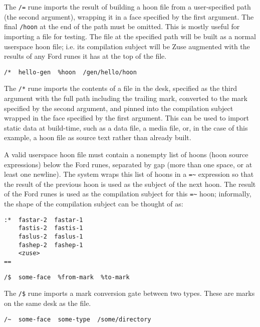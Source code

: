 \documentclass[twoside]{article}
\begin{document}
The \lstinline[style=inlinecode]{/=} rune imports the result of building a hoon file from a user-specified path (the second argument), wrapping it in a face specified by the first argument. The final \lstinline[style=inlinecode]{/hoon} at the end of the path must be omitted. This is mostly useful for importing a file for testing. The file at the specified path will be built as a normal userspace hoon file; i.e. its compilation subject will be Zuse augmented with the results of any Ford runes it has at the top of the file.

\begin{lstlisting}[style=listingcode]
/*  hello-gen  %hoon  /gen/hello/hoon
\end{lstlisting}

The \lstinline[style=inlinecode]{/*} rune imports the contents of a file in the desk, specified as the third argument with the full path including the trailing mark, converted to the mark specified by the second argument, and pinned into the compilation subject wrapped in the face specified by the first argument. This can be used to import static data at build-time, such as a data file, a media file, or, in the case of this example, a hoon file as source text rather than already built.

A valid userspace hoon file must contain a nonempty list of hoons (hoon source expressions) below the Ford runes, separated by gap (more than one space, or at least one newline). The system wraps this list of hoons in a \lstinline[style=inlinecode]{=~} expression so that the result of the previous hoon is used as the subject of the next hoon. The result of the Ford runes is used as the compilation subject for this \lstinline[style=inlinecode]{=~} hoon; informally, the shape of the compilation subject can be thought of as:

\begin{lstlisting}[style=listingcode]
:*  fastar-2  fastar-1
    fastis-2  fastis-1
    faslus-2  faslus-1
    fashep-2  fashep-1
    <zuse>
==
\end{lstlisting}

\begin{lstlisting}[style=listingcode]
  /$  some-face  %from-mark  %to-mark
\end{lstlisting}

The \lstinline[style=inlinecode]{/$} rune imports a mark conversion gate between two types.  These are marks on the same desk as the file.

\begin{lstlisting}[style=listingcode]
  /~  some-face  some-type  /some/directory
\end{lstlisting}
\end{document}
